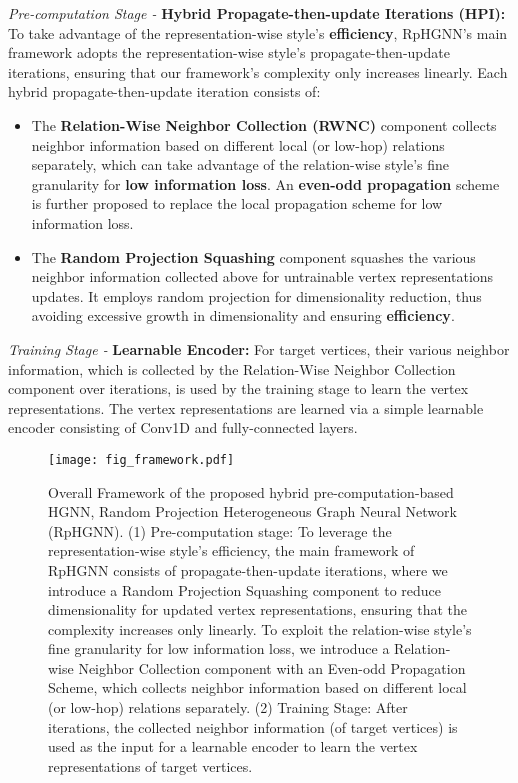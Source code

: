 \documentclass[lettersize,journal]{IEEEtran}
\begin{document}
\textit{Pre-computation Stage -} \textbf{Hybrid Propagate-then-update Iterations (HPI):}
To take advantage of the representation-wise style's \textbf{efficiency}, RpHGNN's main framework adopts the representation-wise style's propagate-then-update iterations, ensuring that our framework's complexity only increases linearly.
Each hybrid propagate-then-update iteration consists of:
\begin{itemize}
\item The \textbf{Relation-Wise Neighbor Collection (RWNC)} component collects neighbor information based on different local (or low-hop) relations separately, which can take advantage of the relation-wise style's fine granularity for \textbf{low information loss}.
An \textbf{even-odd propagation} scheme is further proposed to replace the local propagation scheme for low information loss.
\item The \textbf{Random Projection Squashing} component squashes the various neighbor information collected above for untrainable vertex representations updates.
It employs random projection for dimensionality reduction, thus avoiding excessive growth in dimensionality and ensuring \textbf{efficiency}.
\end{itemize}

\textit{Training Stage -} \textbf{Learnable Encoder:}
For target vertices, their various neighbor information, which is collected by the Relation-Wise Neighbor Collection component over  iterations, is used by the training stage to learn the vertex representations.
The vertex representations are learned via a simple learnable encoder consisting of Conv1D and fully-connected layers.




\begin{figure*}[!t]
\vspace{-6mm}
\centering\texttt{[image: fig\_framework.pdf]}
\vspace{-3mm}
\caption{
Overall Framework of the proposed hybrid pre-computation-based HGNN, Random Projection Heterogeneous Graph Neural Network (RpHGNN).
(1) Pre-computation stage:
To leverage the representation-wise style’s efficiency, the main framework of RpHGNN consists of propagate-then-update iterations, where we introduce a Random Projection Squashing component to reduce dimensionality for updated vertex representations, ensuring that the complexity increases only linearly.
To exploit the relation-wise style’s fine granularity for low information loss, we introduce a Relation-wise Neighbor Collection component with an Even-odd Propagation Scheme, which collects neighbor information based on different local (or low-hop) relations separately.
(2) Training Stage:
After  iterations, the collected neighbor information (of target vertices) is used as the input for a learnable encoder to learn the vertex representations of target vertices.
}
\label{fig:framework}
 \vspace{-4mm}
\end{figure*}
\end{document}
